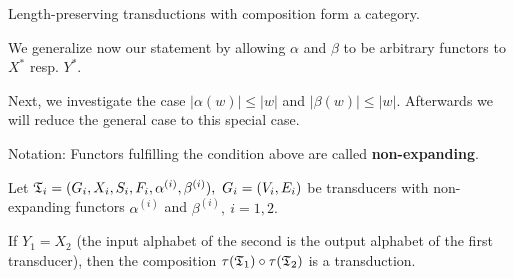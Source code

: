 \begin{corollary}
Length-preserving transductions with composition form a category.
\end{corollary}

We generalize now our statement by allowing $\alpha$ and $\beta$ to be arbitrary
functors to $X^*$ resp. $Y^*$.

Next, we investigate the case $|\alpha(w)| \leq |w|$ and $|\beta(w)| \leq |w|$.
Afterwards we will reduce the general case to this special case.

Notation: Functors fulfilling the condition above are called {\bf
non-expanding}.

\begin{theorem}
Let $\mbox{$\mathfrak{T}$}_i = (G_i, X_i, S_i, F_i, \alpha^{(i)}, \beta^{(i)}),\ G_i = (V_i,
E_i)$ be transducers with non-expanding functors $\alpha^{(i)}$ and
$\beta^{(i)},\ i = 1,2.$

If $Y_1 = X_2$ (the input alphabet of the second is the output alphabet of the
first transducer), then the composition $\tau(\mbox{$\mathfrak{T}$}_1) \circ \tau(\mbox{$\mathfrak{T}$}_2)$
is a transduction.
\end{theorem}

